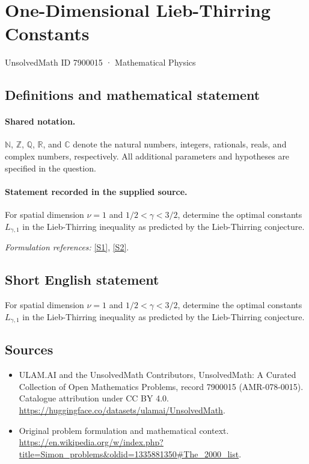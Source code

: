 \documentclass[11pt]{article}
\newcommand{\sref}[2]{\hyperlink{source:#1:#2}{[S#2]}}
\begin{document}
\setcounter{section}{7900014}
\section{One-Dimensional Lieb-Thirring Constants}\label{7900015}
{\small UnsolvedMath ID 7900015 · Mathematical Physics}
\subsection{Definitions and mathematical statement}

\paragraph{Shared notation.}$\mathbb N$, $\mathbb Z$, $\mathbb Q$, $\mathbb R$, and $\mathbb C$ denote the natural numbers, integers, rationals, reals, and complex numbers, respectively. All additional parameters and hypotheses are specified in the question.


\paragraph{Statement recorded in the supplied source.}
For spatial dimension $\nu=1$ and $1/2<\gamma<3/2$, determine the optimal constants $L_{\gamma,1}$ in the Lieb-Thirring inequality as predicted by the Lieb-Thirring conjecture.
\par\smallskip\textit{Formulation references:} \sref{7900015}{1}, \sref{7900015}{2}.
\subsection{Short English statement}
For spatial dimension $\nu=1$ and $1/2<\gamma<3/2$, determine the optimal constants $L_{\gamma,1}$ in the Lieb-Thirring inequality as predicted by the Lieb-Thirring conjecture.
\subsection{Sources}
\begin{itemize}
\item[\hypertarget{source:7900015:1}{S1}] ULAM.AI and the UnsolvedMath Contributors, UnsolvedMath: A Curated Collection of Open Mathematics Problems, record 7900015 (AMR-078-0015). Catalogue attribution under CC BY 4.0.
\url{https://huggingface.co/datasets/ulamai/UnsolvedMath}.
\item[\hypertarget{source:7900015:2}{S2}] Original problem formulation and mathematical context.
\url{https://en.wikipedia.org/w/index.php?title=Simon_problems&oldid=1335881350#The_2000_list}.
\end{itemize}
\label{end:7900015}
\end{document}
